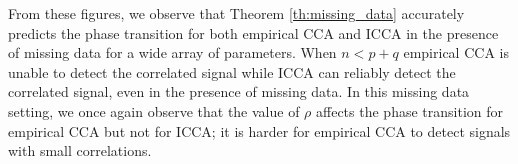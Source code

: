 From these figures, we observe that Theorem \ref{th:missing_data} accurately predicts the
phase transition for both empirical CCA and ICCA in the presence of missing data for a
wide array of parameters. When $n<p+q$ empirical CCA is unable to detect the correlated
signal while ICCA can reliably detect the correlated signal, even in the presence of
missing data. In this missing data setting, we once again observe that the value of $\rho$
affects the phase transition for empirical CCA but not for ICCA; it is harder for
empirical CCA to detect signals with small correlations.

\begin{figure}
  \begin{center}
\end{center}
\end{figure}

